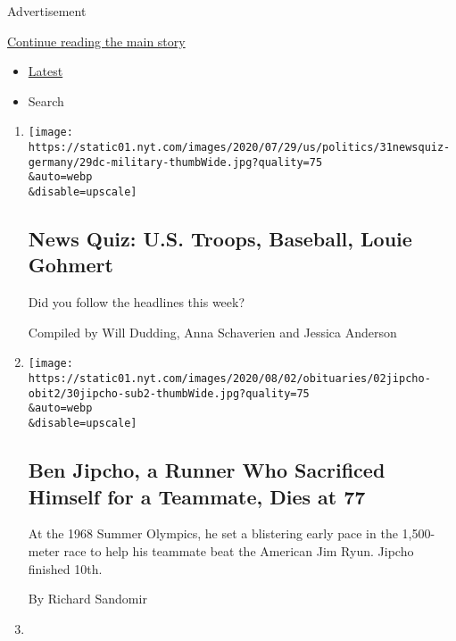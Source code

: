 Advertisement

\protect\hyperlink{after-mid2}{Continue reading the main story}

\begin{itemize}
\tightlist
\item
  \protect\hyperlink{stream-panel}{Latest}
\item
  Search
\end{itemize}

\begin{enumerate}
\def\labelenumi{\arabic{enumi}.}
\item
  \href{/interactive/2020/07/31/briefing/troops-baseball-louie-gohmert-news-quiz.html}{}

  \texttt{[image: https://static01.nyt.com/images/2020/07/29/us/politics/31newsquiz-germany/29dc-military-thumbWide.jpg?quality=75\\\&auto=webp\\\&disable=upscale]}

  \hypertarget{news-quiz-us-troops-baseball-louie-gohmert}{%
  \subsection{News Quiz: U.S. Troops, Baseball, Louie
  Gohmert}\label{news-quiz-us-troops-baseball-louie-gohmert}}

  Did you follow the headlines this week?

  Compiled by Will Dudding, Anna Schaverien and Jessica Anderson
\item
  \href{/2020/07/30/sports/olympics/ben-jipcho-dead.html}{}

  \texttt{[image: https://static01.nyt.com/images/2020/08/02/obituaries/02jipcho-obit2/30jipcho-sub2-thumbWide.jpg?quality=75\\\&auto=webp\\\&disable=upscale]}

  \hypertarget{ben-jipcho-a-runner-who-sacrificed-himself-for-a-teammate-dies-at-77}{%
  \subsection{Ben Jipcho, a Runner Who Sacrificed Himself for a
  Teammate, Dies at
  77}\label{ben-jipcho-a-runner-who-sacrificed-himself-for-a-teammate-dies-at-77}}

  At the 1968 Summer Olympics, he set a blistering early pace in the
  1,500-meter race to help his teammate beat the American Jim Ryun.
  Jipcho finished 10th.

  By Richard Sandomir
\item
  \href{/2020/07/30/arts/martha-nierenberg-entrepreneur-who-sought-arts-return-dies-at-96.html}{}


\end{enumerate}
